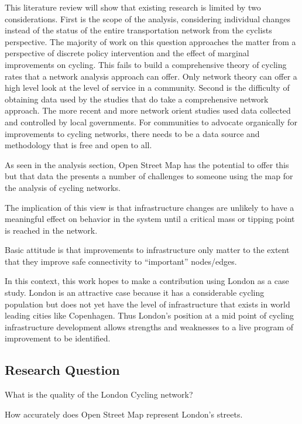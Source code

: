 This literature review will show that existing research is limited by two considerations. First is the scope of the analysis, considering individual changes instead of the status of the entire transportation network from the cyclists perspective.  The majority of work on this question approaches the matter from a perspective of discrete policy intervention and the effect of marginal improvements on cycling. This fails to build a comprehensive theory of cycling rates that a network analysis approach can offer. Only network theory can offer a high level look at the level of service in a community. Second is the difficulty of obtaining data used by the studies that do take a comprehensive network approach. The more recent and more network orient studies used data collected and controlled by local governments. For communities to advocate organically for improvements to cycling networks, there needs to be a data source and methodology that is free and open to all. 

As seen in the analysis section, Open Street Map has the potential to offer this but that data the presents a number of challenges to someone using the map for the analysis of cycling networks. 

 The implication of this view is that infrastructure changes are unlikely to have a meaningful effect on behavior in the system until a critical mass or tipping point is reached in the network. 

Basic attitude is that improvements to infrastructure only matter to the extent that they improve safe connectivity to ``important'' nodes/edges. 

In this context, this work hopes to make a contribution using London as a case study. London is an attractive case because it has a considerable cycling population but does not yet have the level of infrastructure that exists in world leading cities like Copenhagen. Thus London's position at a mid point of cycling infrastructure development allows strengths and weaknesses to a live program of improvement to be identified. 


\subsection{Research Question}

What is the quality of the London Cycling network? 

How accurately does Open Street Map represent London's streets.

